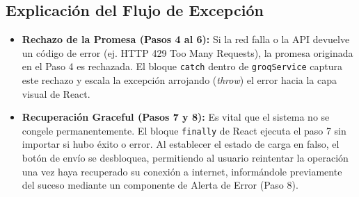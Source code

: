 \subsection{Explicación del Flujo de Excepción}
\begin{itemize}
    \item \textbf{Rechazo de la Promesa (Pasos 4 al 6):} Si la red falla o la API devuelve un código de error (ej. HTTP 429 Too Many Requests), la promesa originada en el Paso 4 es rechazada. El bloque \texttt{catch} dentro de \texttt{groqService} captura este rechazo y escala la excepción arrojando (\textit{throw}) el error hacia la capa visual de React.
    \item \textbf{Recuperación Graceful (Pasos 7 y 8):} Es vital que el sistema no se congele permanentemente. El bloque \texttt{finally} de React ejecuta el paso 7 sin importar si hubo éxito o error. Al establecer el estado de carga en falso, el botón de envío se desbloquea, permitiendo al usuario reintentar la operación una vez haya recuperado su conexión a internet, informándole previamente del suceso mediante un componente de Alerta de Error (Paso 8).
\end{itemize}
